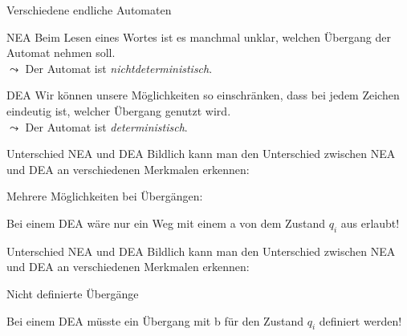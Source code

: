 \begin{frame}[fragile]{Verschiedene endliche Automaten}
    \begin{alertblock}{NEA}
        Beim Lesen eines Wortes ist es manchmal unklar, welchen Übergang der Automat nehmen soll.\\
        $\leadsto$ Der Automat ist \emph{\alert{nichtdeterministisch}}.
    \end{alertblock}
    \begin{alertblock}{DEA}
        Wir können unsere Möglichkeiten so einschränken, dass bei jedem Zeichen eindeutig ist, welcher Übergang genutzt wird.\\
        $\leadsto$ Der Automat ist \alert{\emph{deterministisch}}.
    \end{alertblock}
\end{frame}

\begin{frame}[fragile]{Unterschied NEA und DEA}
    Bildlich kann man den Unterschied zwischen NEA und DEA an verschiedenen Merkmalen erkennen:
    \begin{alertblock}{Mehrere Möglichkeiten bei Übergängen:}
        \begin{center}
        \end{center}
        Bei einem DEA wäre nur ein Weg mit einem \alert{a} von dem Zustand $q_i$ aus erlaubt!
    \end{alertblock}
\end{frame}

\begin{frame}[fragile]{Unterschied NEA und DEA}
    Bildlich kann man den Unterschied zwischen NEA und DEA an verschiedenen Merkmalen erkennen:
    \begin{alertblock}{Nicht definierte Übergänge}
        \begin{center}
        \end{center}
        Bei einem DEA müsste ein Übergang mit \alert{b} für den Zustand $q_i$ definiert werden!
    \end{alertblock}
\end{frame}

